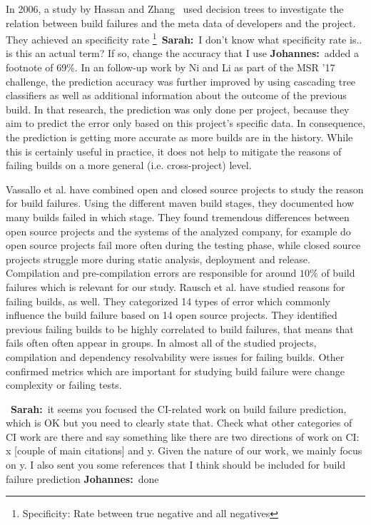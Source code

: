 \documentclass[sigplan, anonymous, review]{acmart}
\newcommand{\sn}[1]{{\color{blue}\textbf{Sarah:}~#1}}
\newcommand{\jk}[1]{{\color{violet}\textbf{Johannes:}~#1}}
\begin{document}
In 2006, a study by Hassan and Zhang~\cite{Pred-Tree} used decision trees to investigate the relation between build failures and the meta data of developers and the project.
They achieved an specificity rate \footnote{Specificity: Rate between true negative and all negatives}~\sn{I don't know what specificity rate is.. is this an actual term? If so, change the accuracy that I use} \jk{added a footnote} of 69\%.
In an follow-up work by Ni and Li as part of the MSR '17 challenge, the prediction accuracy was further improved by using cascading tree classifiers as well as additional information about the outcome of the previous build\cite{Pred-Cascade}. 
In that research, the prediction was only done per project, because they aim to predict the error only based on this project's specific data. In consequence, the prediction is getting more accurate as more builds are in the history.
While this is certainly useful in practice, it does not help to mitigate the reasons of failing builds on a more general (i.e. cross-project) level.

Vassallo et al. \cite{CIFailTypes} have combined open and closed source projects to study the reason for build failures. Using the different maven build stages, they documented how many builds failed in which stage. They found tremendous differences between open source projects and the systems of the analyzed company, for example do open source projects fail more often during the testing phase, while closed source projects struggle more during static analysis, deployment and release. Compilation and pre-compilation errors are responsible for around $10\%$ of build failures which is relevant for our study.
Rausch et al. \cite{FailsinCIFlow} have studied reasons for failing builds, as well. They categorized 14 types of error which commonly influence the build failure based on 14 open source projects. They identified previous failing builds to be highly correlated to build failures, that means that fails often often appear in groups. In almost all of the studied projects, compilation and dependency resolvability were issues for failing builds. Other confirmed metrics which are important for studying build failure were change complexity or failing tests.

~\sn{it seems you focused the CI-related work on build failure prediction, which is OK but you need to clearly state that. Check what other categories of CI work are there and say something like there are two directions of work on CI: x [couple of main citations] and y. Given the nature of our work, we mainly focus on y. I also sent you some references that I think should be included for build failure prediction} \jk{done}
\end{document}
